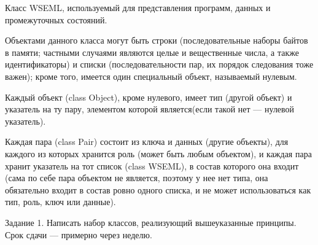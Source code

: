 \documentclass{report}
\begin{document}
    Класс WSEML, используемый для представления программ, данных и промежуточных состояний.

    Объектами данного класса могут быть строки (последовательные наборы байтов в памяти; частными случаями являются целые и вещественные числа, а также идентификаторы) и списки (последовательности пар, их порядок следования тоже важен); кроме того, имеется один специальный объект, называемый нулевым.

    Каждый объект (class Object), кроме нулевого, имеет тип (другой объект) и указатель на ту пару, элементом которой является(если такой нет --- нулевой указатель).

    Каждая пара (class Pair) состоит из ключа и данных (другие объекты), для каждого из которых хранится роль (может быть любым объектом), и каждая пара хранит указатель на тот список (class WSEML), в состав которого она входит (сама по себе пара объектом не является, поэтому у нее нет типа, она обязательно входит в состав ровно одного списка, и не может использоваться как тип, роль, ключ или данные).

    Задание 1. Написать набор классов, реализующий вышеуказанные принципы. Срок сдачи --- примерно через неделю.
\end{document}
